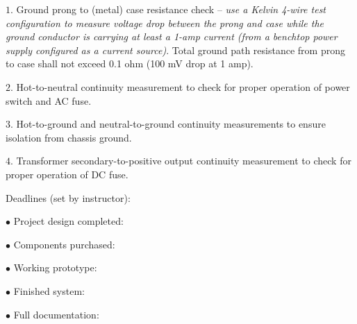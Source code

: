 \medskip
\item{$1.$} Ground prong to (metal) case resistance check -- {\it use a Kelvin 4-wire test configuration to measure voltage drop between the prong and case while the ground conductor is carrying at least a 1-amp current (from a benchtop power supply configured as a current source)}.  Total ground path resistance from prong to case shall not exceed 0.1 ohm (100 mV drop at 1 amp).
\item{$2.$} Hot-to-neutral continuity measurement to check for proper operation of power switch and AC fuse.
\item{$3.$} Hot-to-ground and neutral-to-ground continuity measurements to ensure isolation from chassis ground.
\item{$4.$} Transformer secondary-to-positive output continuity measurement to check for proper operation of DC fuse.
\medskip

\vskip 10pt

\goodbreak
\noindent
Deadlines (set by instructor):

\medskip
\item{$\bullet$} Project design completed: 
\item{$\bullet$} Components purchased:
\item{$\bullet$} Working prototype:
\item{$\bullet$} Finished system:
\item{$\bullet$} Full documentation:
\medskip



